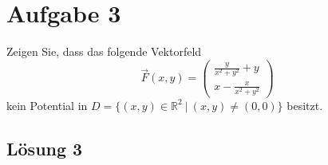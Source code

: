 \documentclass[main.tex]{subfiles}
\begin{document}
\section{Aufgabe 3}
Zeigen Sie, dass das folgende Vektorfeld
\[
\vec{F}(x,y)
= \begin{pmatrix}
	\frac{y}{x^2 + y^2} + y \\[1mm]
	x - \frac{x}{x^2 + y^2}
\end{pmatrix}
\]
kein Potential in $D = \{ (x,y) \in \mathbb{R}^2 \ | \ (x,y) \neq (0,0) \}$ besitzt.

\subsection{Lösung 3}
\end{document}
